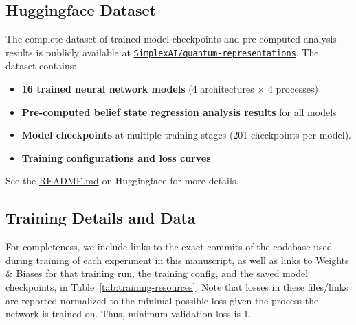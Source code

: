 \documentclass[prx,nofootinbib,onecolumn,showkeys,groupaddress,preprintnumbers,floatfix,
superscriptaddress]{revtex4-1}
\begin{document}
\subsection{Huggingface Dataset}

The complete dataset of trained model checkpoints and pre-computed analysis results is publicly available at \href{https://huggingface.co/datasets/SimplexAI/quantum-representations}{\texttt{SimplexAI/quantum-representations}}. The dataset contains:
\begin{itemize}
    \item \textbf{16 trained neural network models} (4 architectures $\times$ 4 processes)
    \item \textbf{Pre-computed belief state regression analysis results} for all models
    \item \textbf{Model checkpoints} at multiple training stages (201 checkpoints per model).
    \item \textbf{Training configurations and loss curves}
\end{itemize}

See the \href{https://huggingface.co/datasets/SimplexAI/quantum-representations/blob/main/README.md}{README.md} on Huggingface for more details.


\newcommand{\gitcommit}[1]{%
  \StrLeft{#1}{7}[\shortcommit]%
  \href{https://github.com/adamimos/epsilon-transformers/tree/#1}{\texttt{\shortcommit}}%
}

\subsection{Training Details and Data}

For completeness, we include links to the exact commits of the codebase used during training of each experiment in this manuscript, as well as links to Weights \& Biases for that training run, the training config, and the saved model checkpoints, in Table~\ref{tab:training-resources}. Note that losses in these files/links are reported normalized to the minimal possible loss given the process the network is trained on. Thus, minimum validation loss is 1.
\end{document}
